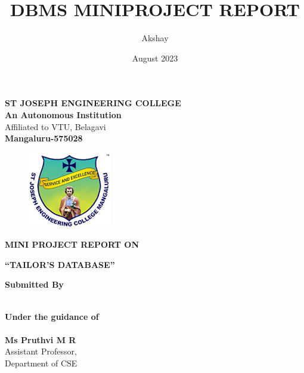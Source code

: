 \documentclass[12pt, letter paper]{report}
\title{DBMS MINIPROJECT REPORT }
\author{Akshay}
\date{August 2023}
\begin{document}
\thispagestyle{empty}
\begin{center}
\Large\textbf{ ST JOSEPH ENGINEERING COLLEGE\\ }
\textbf{An Autonomous Institution}\\
Affiliated to VTU, Belagavi\\
\textbf{Mangaluru-575028}
\end{center}

\begin{figure}[h]
 \centering
 \includegraphics[scale=1.1]{sjec.jpeg}
 \label{sjeclogo}
\end{figure}

\begin{center}
   \textbf{ MINI PROJECT REPORT ON }
\end{center}
\begin{center}
   \Large\textbf{“TAILOR'S DATABASE”}
\end{center}



 
\begin{center}
   \Large \textbf{Submitted By \\}
\end{center}

\begin{center}
\end{center}
   \begin{center}
\large \textbf{\\Under the guidance of \\}
\large  \textbf{ \\Ms Pruthvi  M R\\ }
\large  Assistant Professor,\\ Department of CSE
\end{center}
\end{document}
